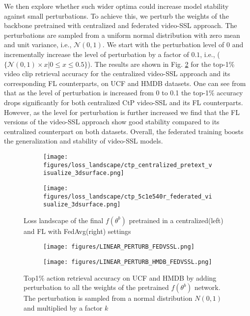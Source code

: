 We then explore whether such wider optima could increase model stability against small perturbations. To achieve this, we perturb the weights of the backbone pretrained with centralized and federated video-SSL approach. The perturbations are sampled from a uniform normal distribution with zero mean and unit variance, i.e., $\mathcal{N}(0,1)$. We start with the perturbation level of $0$ and incrementally increase the level of perturbation by a factor of $0.1$, i.e., ($\{\mathcal{N}(0,1)\times x |0\leq x \leq0.5\}$). 
The results are shown in Fig. \ref{fig:perturb_fed_vs_cent} for the top-1\% video clip retrieval accuracy for the centralized video-SSL approach and its corresponding FL counterparts, on UCF and HMDB datasets. 
One can see from that as the level of perturbation is increased from 0 to 0.1 the top-1\% accuracy drops significantly for both centralized CtP video-SSL and its FL counterparts. However, as the level for perturbation is further increased we find that the FL versions of the video-SSL approach show good stability compared to its centralized counterpart on both datasets. Overall, the federated training boosts the generalization and stability of video-SSL models. 

\begin{figure}[t]
    \centering
    \begin{subfigure}{0.3\textwidth}
    \centering
    \texttt{[image: figures/loss\_landscape/ctp\_centralized\_pretext\_visualize\_3dsurface.png]}
\end{subfigure}\begin{subfigure}{0.3\textwidth}
    \centering
    \texttt{[image: figures/loss\_landscape/ctp\_5c1e540r\_federated\_visualize\_3dsurface.png]}
\end{subfigure}

    \caption{\small Loss landscape of the final $f(\theta^{b})$ pretrained in a centralized(left) and FL with FedAvg(right) settings}
\label{fig:cent_loss_surf}
\end{figure}

\begin{figure}[pt]
    \centering
    
     \begin{subfigure}{0.5\textwidth}
    \centering
    \texttt{[image: figures/LINEAR\_PERTURB\_FEDVSSL.png]}\\
\end{subfigure}\begin{subfigure}{0.5\textwidth}
    \centering
    \texttt{[image: figures/LINEAR\_PERTURB\_HMDB\_FEDVSSL.png]}
\end{subfigure}
    \caption{\small Top1\% action retrieval accuracy on UCF and HMDB by adding perturbation to all the weights of the pretrained $f(\theta^{b})$ network. The perturbation is sampled from a normal distribution $N(0,1)$ and multiplied by a factor $k$}
    \label{fig:perturb_fed_vs_cent}
\end{figure}

